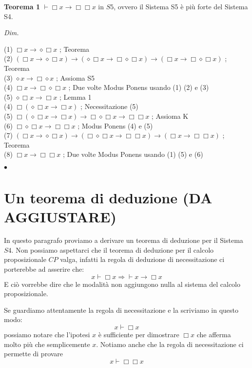 \documentclass[a4paper, 12pt]{article}
\begin{document}
\begin{flushleft}
\textbf{Teorema 1}
$\vdash \Box x \rightarrow \Box \Box x$ in $S5$, ovvero il Sistema S5 è più forte del Sistema S4.

\textit{Dim.}

(1) $\Box x \rightarrow \diamond \Box x$ ; Teorema \\
(2) $(\Box x \rightarrow \diamond \Box x) \rightarrow (\diamond \Box x \rightarrow \Box\diamond\Box x) \rightarrow (\Box x \rightarrow \Box \diamond \Box x)$ ; Teorema \\
(3) $\diamond x \rightarrow \Box \diamond x$ ; Assioma S5 \\
(4) $\Box x \rightarrow \Box \diamond \Box x$ ; Due volte Modus Ponens usando (1) (2) e (3) \\
(5) $\diamond \Box x \rightarrow \Box x$ ; Lemma 1 \\
(4) $\Box (\diamond \Box x \rightarrow \Box x)$ ; Necessitazione (5) \\
(5) $\Box(\diamond\Box x \rightarrow \Box x) \rightarrow \Box \diamond \Box x \rightarrow \Box \Box x$ ; Assioma K \\
(6) $\Box\diamond\Box x \rightarrow \Box\Box x$ ; Modus Ponens (4) e (5) \\
(7) $(\Box x \rightarrow \diamond \Box x) \rightarrow (\Box\diamond\Box x \rightarrow \Box\Box x) \rightarrow (\Box x \rightarrow \Box\Box x)$ ; Teorema \\
(8) $\Box x \rightarrow \Box \Box x$ ; Due volte Modus Ponens usando (1) (5) e (6)

\begin{flushright}$\bullet$\end{flushright}
\end{flushleft}

\section{Un teorema di deduzione (DA AGGIUSTARE)}
In questo paragrafo proviamo a derivare un teorema di deduzione per il Sistema $S4$.
Non possiamo aspettarci che il teorema di deduzione per il calcolo proposizionale $CP$ valga,
infatti la regola di deduzione di necessitazione ci porterebbe ad asserire che:
$$ x \vdash \Box x \Rightarrow \vdash x \rightarrow \Box x $$
E ciò vorrebbe dire che le modalità non aggiungono nulla al sistema del calcolo proposizionale.

Se guardiamo attentamente la regola di necessitazione e la scriviamo in questo modo:
$$x \vdash \Box x$$
possiamo notare che l'ipotesi $x$ è sufficiente per dimostrare $\Box x$ che afferma molto più
che semplicemente $x$.
Notiamo anche che la regola di necessitazione ci permette di provare
$$x \vdash \Box \Box x$$
\end{document}
